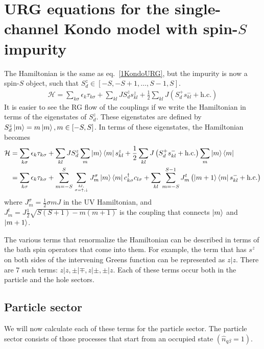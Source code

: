 \documentclass[12pt]{revtex4-2}
\begin{document}
\section{URG equations for the single-channel Kondo model with spin-\(S\) impurity}
The Hamiltonian is the same as eq.~\ref{1KondoURG}, but the impurity is now a spin-\(S\) object, such that \(S_d^z \in \left[-S, -S+1,\ldots,S-1,S\right] \).
\begin{equation}\begin{aligned}
	\mathcal{H} = \sum_{k\sigma}\epsilon_{k}\tau_{k\sigma} + \sum_{kl} J S_d^z s^z_{kl} + \frac{1}{2}\sum_{kl} J \left(S_d^+ s^-_{kl}  + \text{h.c.}\right)
\end{aligned}\end{equation}
It is easier to see the RG flow of the couplings if we write the Hamiltonian in terms of the eigenstates of \(S_d^z\). These eigenstates are defined by \(S_d^z\ket{m} = m\ket{m}, m \in \left[-S, S\right]\). In terms of these eigenstates, the Hamiltonian becomes
\begin{equation}\begin{aligned}
	\mathcal{H} &= \sum_{k\sigma}\epsilon_{k}\tau_{k\sigma} + \sum_{kl} J S_d^z\sum_m \ket{m}\bra{m} s^z_{kl} + \frac{1}{2}\sum_{kl} J \left(S_d^+ s^-_{kl}  + \text{h.c.}\right)\sum_m \ket{m}\bra{m} \\
		    &= \sum_{k\sigma}\epsilon_{k}\tau_{k\sigma} + \sum_{m=-S}^S \sum_{kl,\atop{\sigma=\uparrow,\downarrow}} J^\sigma_m \ket{m}\bra{m} c^\dagger_{k \sigma}c_{l \sigma} + \sum_{kl} \sum_{m=-S}^{S-1} J^t_{m} \left(\ket{m+1}\bra{m} s^-_{kl}  + \text{h.c.}\right)
\end{aligned}\end{equation}
where \(J^\sigma_m = \frac{1}{2} \sigma m J\) in the UV Hamiltonian, and \(J^t_{m} = J\frac{1}{2}\sqrt{S(S+1) - m(m+1)}\) is the coupling that connects \(\ket{m}\) and \(\ket{m+1}\).

The various terms that renormalize the Hamiltonian can be described in terms of the bath spin operators that come into them. For example, the term that has \(s^z\) on both sides of the intervening Greens function can be represented as \(z|z\). There are 7 such terms: \(z|z, \pm|\mp, z|\pm, \pm|z\). Each of these terms occur both in the particle and the hole sectors.

\subsection{Particle sector}
We will now calculate each of these terms for the particle sector. The particle sector consists of those processes that start from an occupied state \(\left(\hat n_{q\beta} = 1\right)\).
\end{document}
